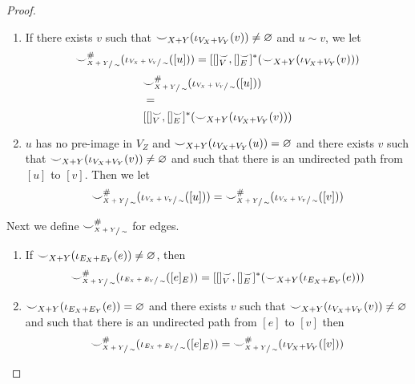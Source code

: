 \begin{proof}
	\begin{enumerate}
		\item If there exists $v$ such that ${\smile}_{X+Y}(\iota_{V_{X} + V_{Y}}(v)) \not = \varnothing$ and $u \sim v$, we let
		      \ifdefined \ONECOLUMN
			      \[
				      {\smile}_{\sfrac{X+Y}{\sim}}^{{\#}}(\iota_{\sfrac{V_{X} + V_{Y}}{\sim}}([u]))
				      =
				      [[]_{V}^{{\smile}},[]_{E}^{{\smile}}]^{*}({\smile}_{X+Y}(\iota_{V_{X} + V_{Y}}(v)))
			      \]
		      \else
			      \begin{align*}
				       & {\smile}_{\sfrac{X+Y}{\sim}}^{{\#}}(\iota_{\sfrac{V_{X} + V_{Y}}{\sim}}([u]))           \\
				       & =                                                                                               \\
				       & [[]_{V}^{{\smile}},[]_{E}^{{\smile}}]^{*}({\smile}_{X+Y}(\iota_{V_{X} + V_{Y}}(v)))
			      \end{align*}
		      \fi
		\item $u$ has no pre-image in $V_{Z}$ and ${\smile}_{X+Y}(\iota_{V_{X} + V_{Y}}(u)) = \varnothing$ and there exists $v$ such that ${\smile}_{X+Y}(\iota_{V_{X} + V_{Y}}(v)) \not = \varnothing$ and such that there is an undirected path from $[u]$ to $[v]$.
		      Then we let
		      \[
			      {\smile}_{\sfrac{X+Y}{\sim}}^{{\#}}(\iota_{\sfrac{V_{X} + V_{Y}}{\sim}}([u])) = {\smile}_{\sfrac{X+Y}{\sim}}^{{\#}}(\iota_{\sfrac{V_{X} + V_{Y}}{\sim}}([v]))
		      \]
	\end{enumerate}

	Next we define ${\smile}_{\sfrac{X+Y}{\sim}}^{{\#}}$ for edges.

	\begin{enumerate}
		\item If ${\smile}_{X+Y}(\iota_{E_{X} + E_{Y}}(e)) \not = \varnothing$, then
		      \begin{align*}
			      {\smile}_{\sfrac{X+Y}{\sim}}^{{\#}}(\iota_{\sfrac{E_{X} + E_{Y}}{\sim}}([e]_{E})) =
			      [[]_{V}^{{\smile}}, []_{E}^{{\smile}}]^{*}({\smile}_{X+Y}(\iota_{E_{X} + E_{Y}}(e)))
		      \end{align*}
		\item ${\smile}_{X+Y}(\iota_{E_{X} + E_{Y}}(e)) = \varnothing$ and there exists $v$ such that ${\smile}_{X+Y}(\iota_{V_{X} + V_{Y}}(v)) \not = \varnothing$ and such that there is an undirected path from $[e]$ to $[v]$
		      then
		      \[
			      {\smile}_{\sfrac{X+Y}{\sim}}^{{\#}}(\iota_{\sfrac{E_{X} + E_{Y}}{\sim}}([e]_{E})) = {\smile}_{\sfrac{X+Y}{\sim}}^{{\#}}(\iota_{V_{X} + V_{Y}}([v]))
		      \]
	\end{enumerate}


\end{proof}
